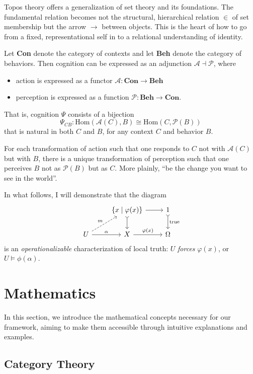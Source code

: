 \documentclass{article}
\begin{document}
Topos theory offers a generalization of set theory and its foundations. The fundamental relation becomes not the structural, hierarchical relation $\in$ of set membership but the arrow $\to$ between objects. This is the heart of how to go from a fixed, representational self in to a relational understanding of identity.

Let \textbf{Con} denote the category of contexts and let \textbf{Beh} denote the category of behaviors. Then cognition can be expressed as an adjunction $\mathcal{A} \dashv \mathcal{P}$, where

\begin{itemize}
    \item action is expressed as a functor $\mathcal{A} \colon \textbf{Con} \to \textbf{Beh}$
    \item perception is expressed as a function $\mathcal{P} \colon \textbf{Beh} \to \textbf{Con}$.
\end{itemize}

That is, cognition $\Psi$ consists of a bijection
\[
    \Psi_{CB} \colon \text{Hom} ( \mathcal{A}(C), B ) \cong \text{Hom}(C, \mathcal{P}(B))
\]
that is natural in both $C$ and $B$, for any context $C$ and behavior $B$.

For each transformation of action such that one responds to $C$ not with $\mathcal{A}(C)$ but with $B$, there is a unique transformation of perception such that one perceives $B$ not as $\mathcal{P}(B)$ but as $C$. More plainly, ``be the change you want to see in the world''.

In what follows, I will demonstrate that the diagram
\[
    \begin{tikzcd}
        & \{ x \mid \varphi(x) \}  \arrow[r] \arrow[d, tail] & 1 \arrow[d, tail, "\text{true}"] \\
        U \arrow[r, "\alpha"] \arrow[ru, dashed, "m"] & X \arrow[r, "\varphi(x)"] & \Omega
    \end{tikzcd}
\]
is an \emph{operationalizable} characterization of local truth: $U$ \emph{forces} $\varphi(x)$, or $U \vDash \phi(\alpha)$.

\section{Mathematics}
In this section, we introduce the mathematical concepts necessary for our framework, aiming to make them accessible through intuitive explanations and examples.

\subsection{Category Theory}
\end{document}
